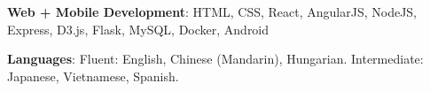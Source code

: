 






\textbf{Web + Mobile Development}: HTML, CSS, React, AngularJS, NodeJS, Express, D3.js, Flask, MySQL, Docker, Android %


\textbf{Languages}: Fluent: English, Chinese (Mandarin), Hungarian. Intermediate: Japanese, Vietnamese, Spanish.\\ %

